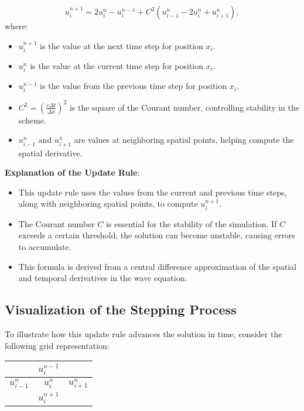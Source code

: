 \documentclass{article}
\begin{document}
		\begin{equation}
			u_i^{n+1} = 2u_i^n - u_i^{n-1} + C^2 (u_{i-1}^n - 2u_i^n + u_{i+1}^n),
		\end{equation}
		where:
		\begin{itemize}
			\item $u_i^{n+1}$ is the value at the next time step for position $x_i$.
			\item $u_i^n$ is the value at the current time step for position $x_i$.
			\item $u_i^{n-1}$ is the value from the previous time step for position $x_i$.
			\item $C^2 = \left( \frac{c \Delta t}{\Delta x} \right)^2$ is the square of the Courant number, controlling stability in the scheme.
			\item $u_{i-1}^n$ and $u_{i+1}^n$ are values at neighboring spatial points, helping compute the spatial derivative.
		\end{itemize}
		
		
		\textbf{Explanation of the Update Rule}:
		\begin{itemize}
			\item This update rule uses the values from the current and previous time steps, along with neighboring spatial points, to compute $u_i^{n+1}$.
			\item The Courant number $C$ is essential for the stability of the simulation. If $C$ exceeds a certain threshold, the solution can become unstable, causing errors to accumulate.
			\item This formula is derived from a central difference approximation of the spatial and temporal derivatives in the wave equation.
		\end{itemize}
		
		\subsection{Visualization of the Stepping Process}
		
		To illustrate how this update rule advances the solution in time, consider the following grid representation:
		
		\begin{center}
			\begin{tabular}{|c|c|c|}
				\hline
				& $u_i^{n-1}$ & \\
				\hline
				$u_{i-1}^n$ & $u_i^n$ & $u_{i+1}^n$ \\
				\hline
				& $u_i^{n+1}$ & \\
				\hline
			\end{tabular}
		\end{center}
		
\end{document}
